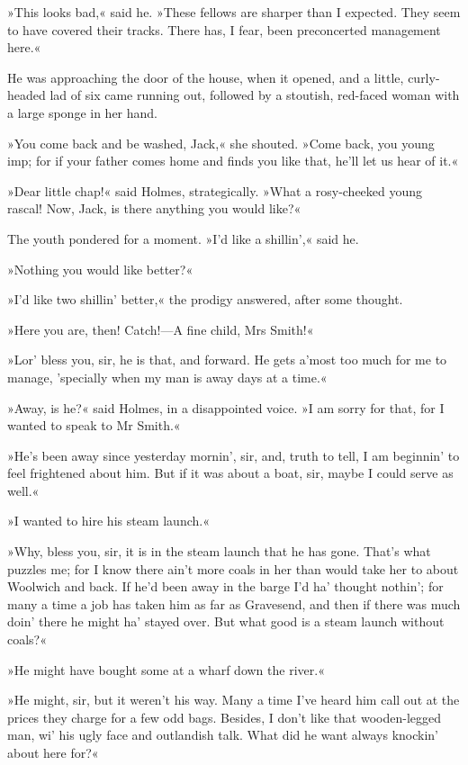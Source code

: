 »This looks bad,« said he. »These fellows are sharper than I expected. They seem to have covered their tracks. There has, I fear, been preconcerted management here.«

He was approaching the door of the house, when it opened, and a little, curly-headed lad of six came running out, followed by a stoutish, red-faced woman with a large sponge in her hand.

»You come back and be washed, Jack,« she shouted. »Come back, you young imp; for if your father comes home and finds you like that, he'll let us hear of it.«

»Dear little chap!« said Holmes, strategically. »What a rosy-cheeked young rascal! Now, Jack, is there anything you would like?«

The youth pondered for a moment. »I'd like a shillin',« said he.

»Nothing you would like better?«

»I'd like two shillin' better,« the prodigy answered, after some thought.

»Here you are, then! Catch!—A fine child, Mrs Smith!«

»Lor' bless you, sir, he is that, and forward. He gets a'most too much for me to manage, 'specially when my man is away days at a time.«

»Away, is he?« said Holmes, in a disappointed voice. »I am sorry for that, for I wanted to speak to Mr Smith.«

»He's been away since yesterday mornin', sir, and, truth to tell, I am beginnin' to feel frightened about him. But if it was about a boat, sir, maybe I could serve as well.«

»I wanted to hire his steam launch.«

»Why, bless you, sir, it is in the steam launch that he has gone. That's what puzzles me; for I know there ain't more coals in her than would take her to about Woolwich and back. If he'd been away in the barge I'd ha' thought nothin'; for many a time a job has taken him as far as Gravesend, and then if there was much doin' there he might ha' stayed over. But what good is a steam launch without coals?«

»He might have bought some at a wharf down the river.«

»He might, sir, but it weren't his way. Many a time I've heard him call out at the prices they charge for a few odd bags. Besides, I don't like that wooden-legged man, wi' his ugly face and outlandish talk. What did he want always knockin' about here for?«

